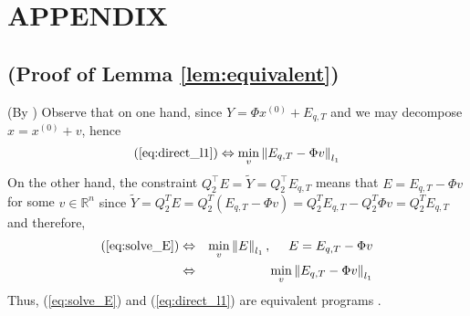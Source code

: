 \documentclass[twocolumn]{autart}    %
\newcommand{\norm}[1]{\left\lVert#1\right\rVert}
\newcommand{\rev}[1]{{\normalsize{{{\color{blue}#1}}}}}
\begin{document}


\appendix
\vspace{-0.4cm}
\section{APPENDIX}
\vspace{-0.5cm}
\rev{
\subsection*{(Proof of Lemma \ref{lem:equivalent})}
\vspace{-0.4cm}
\begin{pf} 
 (By \cite{Candes_Tao}) Observe that on one hand, since $Y = \Phi x^{(0)} + E_{q,T}$ and we may decompose $x = x^{(0)} + v$, hence 
\begin{equation}
	(\ref{eq:direct_l1}) \Leftrightarrow \min_v \norm{  E_{q,T} - \Phi v }_{l_1} \nonumber 
\end{equation}
On the other hand, the constraint $Q_2^\top E = \tilde Y = Q_2^\top E_{q,T}$ means that $E = E_{q,T} - \Phi v $ for some $v \in \mathbb{R}^n$ \rev{since $\tilde Y = Q_2^T E = Q_2^T (E_{q,T} - \Phi v) = Q_2^T E_{q,T} - Q_2^T \Phi v = Q_2^T E_{q,T}$} and therefore,
\vspace{-0.4cm}
\begin{eqnarray}
	(\ref{eq:solve_E}) &\Leftrightarrow& \min_v \norm{ E }_{l_1}, ~~~~ E = E_{q,T}-\Phi v  \nonumber \\
				 & \Leftrightarrow& \min_v  \norm{E_{q,T}-\Phi v}_{l_1} \nonumber 
\end{eqnarray}
Thus, (\ref{eq:solve_E}) and (\ref{eq:direct_l1}) are equivalent programs \cite{Candes_Tao}.
\end{pf}
}
\vspace{-0.65cm}
\end{document}
